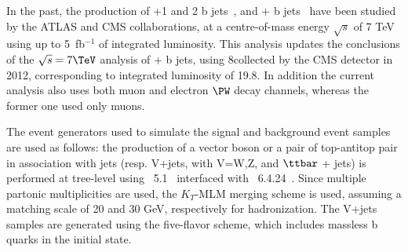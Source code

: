 

In the past, the production of \cPZ+1 and 2 b
jets~\cite{Chatrchyan:2012vr,Chatrchyan:2014dha,Chatrchyan:2013zja,Aad:2011jn,Aad:2014dvb},
and \Wpm+ b jets~\cite{Chatrchyan:2013uza,Aad:2013vka} have been
studied by the ATLAS and CMS collaborations, at a centre-of-mass
energy $\sqrt{s}$ of 7 TeV using up to 5~fb$^{-1}$ of integrated
luminosity. This analysis  updates the conclusions of the $\sqrt{s}=7\TeV$ analysis of  \Wpm+ b jets, using  8\TeV collected by the CMS detector in 2012, corresponding to integrated luminosity of 19.8\fbinv.
In addition the current analysis also uses both muon and electron $\PW$ decay channels, whereas the former one used only muons.

The event generators used to simulate the signal and
background event samples are used as follows: the production of a vector boson or a pair of top-antitop pair in association with jets
(resp. V+jets, with V=W,Z, and $\ttbar$ + jets) is performed at tree-level using \MADGRAPH~5.1~\cite{Madgraph5} interfaced with
\PYTHIA~6.4.24~\cite{Sjostrand:2006za}.
Since multiple partonic multiplicities are used, the $K_T$-MLM merging scheme is used, assuming a matching scale of 20 and 30 GeV, respectively
for hadronization.
The V+jets samples are generated using the five-flavor scheme, which includes massless b quarks in the initial state.

